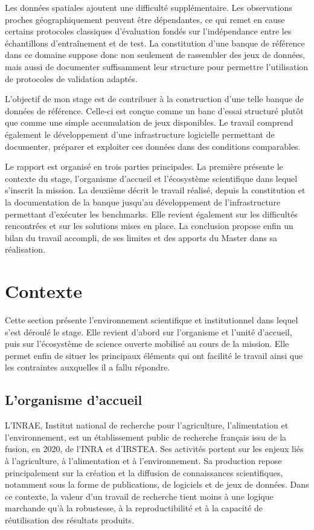 \documentclass[11pt,a4paper]{article}
\begin{document}
Les données spatiales ajoutent une difficulté supplémentaire. Les observations proches géographiquement peuvent être dépendantes, ce qui remet en cause certains protocoles classiques d'évaluation fondés sur l'indépendance entre les échantillons d'entraînement et de test. La constitution d'une banque de référence dans ce domaine suppose donc non seulement de rassembler des jeux de données, mais aussi de documenter suffisamment leur structure pour permettre l'utilisation de protocoles de validation adaptés.

L'objectif de mon stage est de contribuer à la construction d'une telle banque de données de référence. Celle-ci est conçue comme un banc d'essai structuré plutôt que comme une simple accumulation de jeux disponibles. Le travail comprend également le développement d'une infrastructure logicielle permettant de documenter, préparer et exploiter ces données dans des conditions comparables.

Le rapport est organisé en trois parties principales. La première présente le contexte du stage, l'organisme d'accueil et l'écosystème scientifique dans lequel s'inscrit la mission. La deuxième décrit le travail réalisé, depuis la constitution et la documentation de la banque jusqu'au développement de l'infrastructure permettant d'exécuter les benchmarks. Elle revient également sur les difficultés rencontrées et sur les solutions mises en place. La conclusion propose enfin un bilan du travail accompli, de ses limites et des apports du Master dans sa réalisation.
\section{Contexte}

Cette section présente l'environnement scientifique et institutionnel dans lequel s'est déroulé le stage. Elle revient d'abord sur l'organisme et l'unité d'accueil, puis sur l'écosystème de science ouverte mobilisé au cours de la mission. Elle permet enfin de situer les principaux éléments qui ont facilité le travail ainsi que les contraintes auxquelles il a fallu répondre.

\subsection{L'organisme d'accueil}

L'INRAE, Institut national de recherche pour l'agriculture, l'alimentation et l'environnement, est un établissement public de recherche français issu de la fusion, en 2020, de l'INRA et d'IRSTEA. Ses activités portent sur les enjeux liés à l'agriculture, à l'alimentation et à l'environnement. Sa production repose principalement sur la création et la diffusion de connaissances scientifiques, notamment sous la forme de publications, de logiciels et de jeux de données. Dans ce contexte, la valeur d'un travail de recherche tient moins à une logique marchande qu'à la robustesse, à la reproductibilité et à la capacité de réutilisation des résultats produits.
\end{document}
